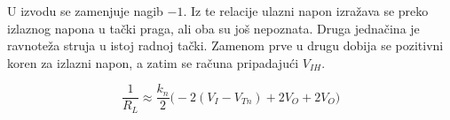 U izvodu se zamenjuje nagib $-1$. Iz te relacije ulazni napon izražava se preko izlaznog napona u tački praga, ali oba su još nepoznata. Druga jednačina je ravnoteža struja u istoj radnoj tački. Zamenom prve u drugu dobija se pozitivni koren za izlazni napon, a zatim se računa pripadajući $V_{IH}$.

\[\frac1{R_L}\approx\frac{k_n}{2}\bigl(-2(V_I-V_{Tn})+2V_O+2V_O\bigr)\]

